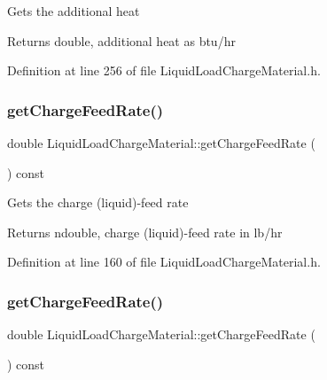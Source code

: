 Gets the additional heat \begin{DoxyReturn}{Returns}
double, additional heat as btu/hr 
\end{DoxyReturn}


Definition at line 256 of file Liquid\+Load\+Charge\+Material.\+h.

\mbox{\label{class_liquid_load_charge_material_af818c541527b3b28a8f84a08dc0c884e}} 
\subsubsection{\texorpdfstring{get\+Charge\+Feed\+Rate()}{getChargeFeedRate()}\hspace{0.1cm}{\footnotesize\ttfamily [1/3]}}
{\footnotesize\ttfamily double Liquid\+Load\+Charge\+Material\+::get\+Charge\+Feed\+Rate (\begin{DoxyParamCaption}{ }\end{DoxyParamCaption}) const\hspace{0.3cm}{\ttfamily [inline]}}

Gets the charge (liquid)-\/feed rate \begin{DoxyReturn}{Returns}
ndouble, charge (liquid)-\/feed rate in lb/hr 
\end{DoxyReturn}


Definition at line 160 of file Liquid\+Load\+Charge\+Material.\+h.

\mbox{\label{class_liquid_load_charge_material_af818c541527b3b28a8f84a08dc0c884e}} 
\subsubsection{\texorpdfstring{get\+Charge\+Feed\+Rate()}{getChargeFeedRate()}\hspace{0.1cm}{\footnotesize\ttfamily [2/3]}}
{\footnotesize\ttfamily double Liquid\+Load\+Charge\+Material\+::get\+Charge\+Feed\+Rate (\begin{DoxyParamCaption}{ }\end{DoxyParamCaption}) const\hspace{0.3cm}{\ttfamily [inline]}}

